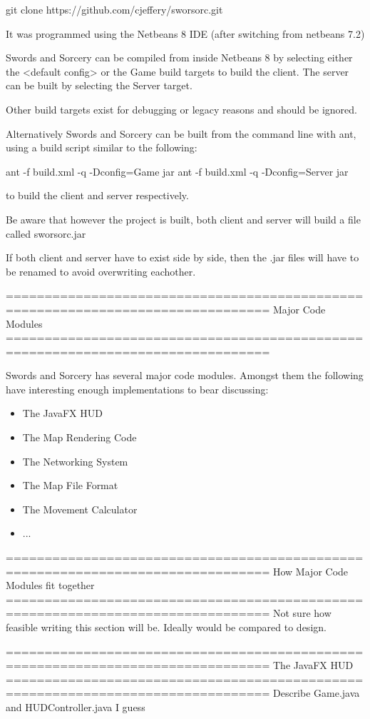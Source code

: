 \documentclass[12pt,a4paper]{article}
\begin{document}
    git clone https://github.com/cjeffery/sworsorc.git

It was programmed using the Netbeans 8 IDE (after switching from netbeans 7.2)

Swords and Sorcery can be compiled from inside Netbeans 8 by selecting either
the <default config> or the Game build targets to build the client. The server
can be built by selecting the Server target.

Other build targets exist for debugging or legacy reasons and should be ignored.

Alternatively Swords and Sorcery can be built from the command line with ant,
using a build script similar to the following:

    ant -f build.xml -q -Dconfig=Game jar
    ant -f build.xml -q -Dconfig=Server jar

to build the client and server respectively.

Be aware that however the project is built, 
both client and server will build a file called sworsorc.jar

If both client and server have to exist side by side,
then the .jar files will have to be renamed to avoid overwriting eachother.

================================================================================
Major Code Modules
================================================================================

Swords and Sorcery has several major code modules. Amongst them the following
have interesting enough implementations to bear discussing:

\begin{itemize}
	\item The JavaFX HUD	
	\item The Map Rendering Code
	\item The Networking System
	\item The Map File Format
	\item The Movement Calculator
    \item ...
\end{itemize}

================================================================================
How Major Code Modules fit together
================================================================================
Not sure how feasible writing this section will be.
Ideally would be compared to design.

================================================================================
The JavaFX HUD
================================================================================
Describe Game.java and HUDController.java I guess
\end{document}
